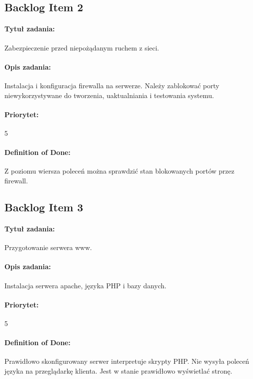 \subsection{Backlog Item 2}
\paragraph{Tytuł zadania:}
Zabezpieczenie przed niepożądanym ruchem z sieci.

\paragraph{Opis zadania:}
Instalacja i konfiguracja firewalla na serwerze. Należy zablokować porty niewykorzystywane do tworzenia, uaktualniania i testowania systemu.

\paragraph{Priorytet:}
5

\paragraph{Definition of Done:}
Z poziomu wiersza poleceń można sprawdzić stan blokowanych portów przez firewall.


\subsection{Backlog Item 3}
\paragraph{Tytuł zadania:}
Przygotowanie serwera www.

\paragraph{Opis zadania:}
Instalacja serwera apache, języka PHP i bazy danych.

\paragraph{Priorytet:}
5

\paragraph{Definition of Done:}
Prawidłowo skonfigurowany serwer interpretuje skrypty PHP. Nie wysyła poleceń języka na przeglądarkę klienta. Jest w stanie prawidłowo wyświetlać stronę.

